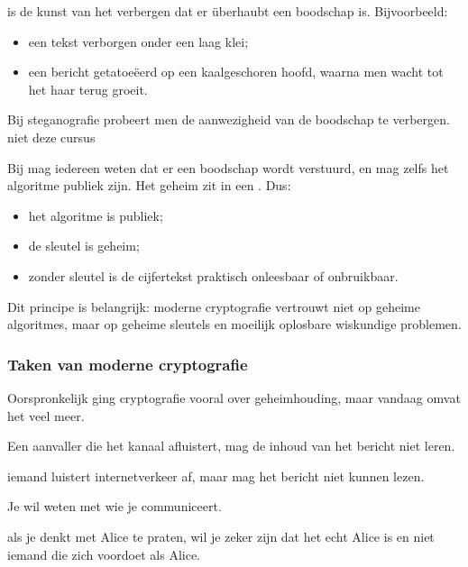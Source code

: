 
 is de kunst van het verbergen dat er überhaubt een boodschap is. Bijvoorbeeld:
\begin{itemize}
    \item een tekst verborgen onder een laag klei;
    \item een bericht getatoeëerd op een kaalgeschoren hoofd, waarna men wacht tot het haar terug groeit.
\end{itemize}
Bij steganografie probeert men de aanwezigheid van de boodschap te verbergen. \textcolor{red!66}{niet deze cursus}


Bij  mag iedereen weten dat er een boodschap wordt verstuurd, en mag zelfs het algoritme publiek zijn. Het geheim zit in een . Dus:
\begin{itemize}
    \item het algoritme is publiek;
    \item de sleutel is geheim;
    \item zonder sleutel is de cijfertekst praktisch onleesbaar of onbruikbaar.
\end{itemize}
Dit principe is belangrijk: moderne cryptografie vertrouwt niet op geheime algoritmes, maar op geheime sleutels en moeilijk oplosbare wiskundige problemen.

\subsubsection{Taken van moderne cryptografie}

Oorspronkelijk ging cryptografie vooral over geheimhouding, maar vandaag omvat het veel meer.


Een aanvaller die het kanaal afluistert, mag de inhoud van het bericht niet leren.

\textbf{} iemand luistert internetverkeer af, maar mag het bericht niet kunnen lezen.


Je wil weten met wie je communiceert.

\textbf{} als je denkt met Alice te praten, wil je zeker zijn dat het echt Alice is en niet iemand die zich voordoet als Alice.


